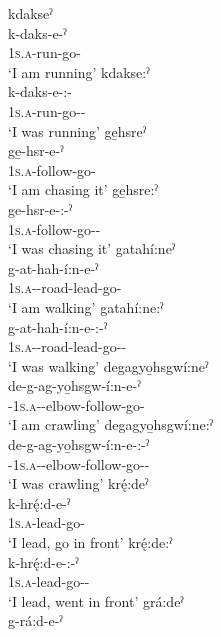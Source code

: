 \ex 
\ea kdakseˀ\\
\gll k-daks-e-ˀ\\
 \textsc{1s.a}-run-go-{\stative}\\
\glt `I am running'
\ex kdakse:ˀ\\ 
    \gll k-daks-e-:- \\
    \textsc{1s.a}-run-go-{\purposive}-{\stative}\\
    \glt ‘I was running’
\z
\ex 
\ea ge̱hsreˀ\\
\gll ge̱-hsr-e-ˀ\\
 \textsc{1s.a}-follow-go-{\stative}\\
\glt `I am chasing it'
\ex ge̱hsre:ˀ\\
    \gll ge-hsr-e-:-ˀ\\
    \textsc{1s.a}-follow-go-{\purposive}-{\stative}\\
    \glt ‘I was chasing it’
\z 
\newpage
\ex 
\ea gatahí:neˀ\\
\gll g-at-hah-í:n-e-ˀ\\
 \textsc{1s.a}-{\semireflexive}-road-lead-go-{\stative}\\
\glt `I am walking'
\ex gatahí:ne:ˀ\\
    \gll g-at-hah-í:n-e-:-ˀ\\
    \textsc{1s.a}-{\semireflexive}-road-lead-go-{\purposive}-{\stative}\\
    \glt ‘I was walking’
\z 
\ex 
\ea degagyo̱hsgwí:neˀ\\
\gll de-g-ag-yo̱hsgw-í:n-e-ˀ\\
 {\dualic}-\textsc{1s.a}-{\semireflexive}-elbow-follow-go-{\stative}\\
\glt `I am crawling'
\ex degagyo̱hsgwí:ne:ˀ \\
    \gll de-g-ag-yo̱hsgw-í:n-e-:-ˀ\\
    {\dualic}-\textsc{1s.a}-{\semireflexive}-elbow-follow-go-{\purposive}-{\stative}\\
    \glt ‘I was crawling’
\z 
\ex 
\ea krę́:deˀ\\
\gll k-hrę́:d-e-ˀ\\
 \textsc{1s.a}-lead-go-{\stative}\\
\glt `I lead, go in front'
\ex krę́:de:ˀ\\ 
    \gll k-hrę́:d-e-:-ˀ\\ 
    \textsc{1s.a}-lead-go-{\purposive}-{\stative}\\
    \glt ‘I lead, went in front’
\z 
\ex 
\ea grá:deˀ\\
\gll g-rá:d-e-ˀ\\
